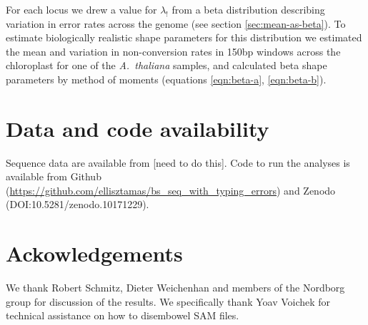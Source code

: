 \documentclass[twocolumn,twoside,lettersize]{article}
\begin{document}
For each locus we drew a value for $\lambda_!$ from a beta distribution describing variation in error rates across the genome (see section \ref{sec:mean-as-beta}).
To estimate biologically realistic shape parameters for this distribution we estimated the mean and variation in non-conversion rates in 150bp windows across the chloroplast for one of the \emph{A.~thaliana} samples, and calculated beta shape parameters by method of moments (equations \ref{eqn:beta-a}, \ref{eqn:beta-b}).

\section{Data and code availability}

Sequence data are available from [need to do this].
Code to run the analyses is available from Github (\url{https://github.com/ellisztamas/bs_seq_with_typing_errors}) and Zenodo (DOI:10.5281/zenodo.10171229).

\section{Ackowledgements}

We thank Robert Schmitz, Dieter Weichenhan and members of the Nordborg group for discussion of the results.
We specifically thank Yoav Voichek for technical assistance on how to disembowel SAM files.

\printbibliography %
\end{document}
